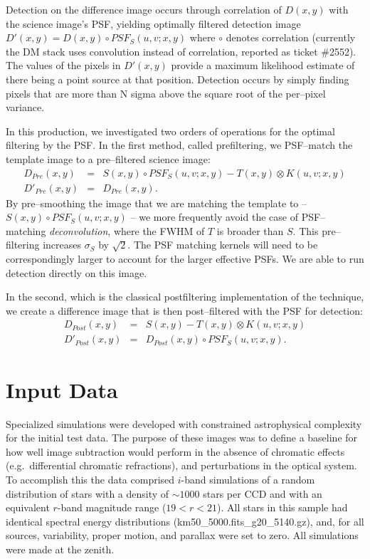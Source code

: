 \documentclass[prd, nofootinbib, floatfix, 11pt,tightenlines,times]{article}
\begin{document}
Detection on the difference image occurs through correlation of
$D(x,y)$ with the science image's PSF, yielding optimally filtered
detection image $D'(x,y) = D(x,y) \circ PSF_S(u,v;x,y)$ where $\circ$
denotes correlation (currently the DM stack uses convolution instead of correlation,
reported as ticket \#2552).  The values of the pixels in $D'(x,y)$ provide a
maximum likelihood estimate of there being a point source at that
position.  Detection occurs by simply finding pixels that are more
than N sigma above the square root of the per--pixel variance.  


In this production, we investigated two orders of operations for the
optimal filtering by the PSF.  In the first method, called
prefiltering, we PSF--match the template image to a pre--filtered
science image:
\begin{eqnarray}
D_{Pre}(x,y) & = & S(x,y) \circ PSF_S(u,v;x,y) - T(x,y) \otimes K(u,v;x,y) \nonumber \\ 
D'_{Pre}(x,y) & = & D_{Pre}(x,y). \nonumber 
\end{eqnarray}
By pre--smoothing the image that we are matching the template to --
$S(x,y) \circ PSF_S(u,v;x,y)$ -- we more frequently avoid the case of
PSF--matching {\it deconvolution}, where the FWHM of $T$ is broader
than $S$.  This pre--filtering increases $\sigma_S$ by $\sqrt{2}$.
The PSF matching kernels will need to be correspondingly larger to
account for the larger effective PSFs.  We are able to run detection
directly on this image.

In the second, which is the classical postfiltering implementation of
the technique, we create a difference image that is then
post--filtered with the PSF for detection:
\begin{eqnarray}
D_{Post}(x,y) & = & S(x,y) - T(x,y) \otimes K(u,v;x,y) \nonumber \\ 
D'_{Post}(x,y) & = & D_{Post}(x,y) \circ PSF_S(u,v;x,y).  \nonumber 
\end{eqnarray}


\section{Input Data}

Specialized simulations were developed with constrained astrophysical
complexity for the initial test data. The purpose of these images was
to define a baseline for how well image subtraction would perform in
the absence of chromatic effects (e.g.\ differential chromatic
refractions), and perturbations in the optical system. To accomplish
this the data comprised $i$-band simulations of a random distribution
of stars with a density of $\sim 1000$ stars per CCD and with an
equivalent $r$-band magnitude range ($19<r<21$). All stars in this
sample had identical spectral energy distributions
(km50\_5000.fits\_g20\_5140.gz), and, for all sources, variability,
proper motion, and parallax were set to zero. All simulations were
made at the zenith.
\end{document}
